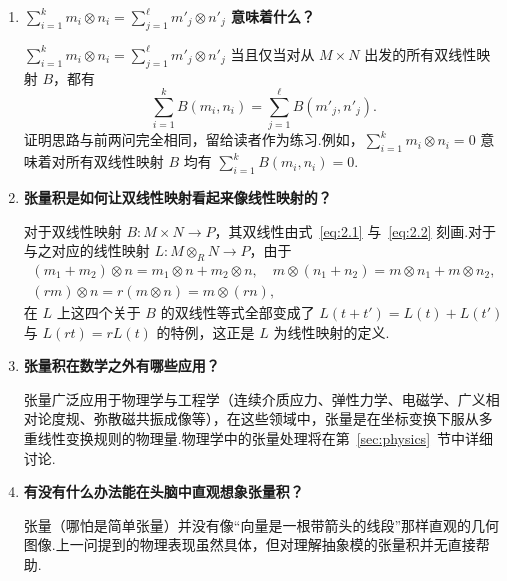 \begin{enumerate}
  回到例~\ref{ex:torsion-collapse}，当 $A$ 为扭群时 $\Q \otimes_\Z A = 0$，这无非是说从 $\Q \times A$ 出发的每一个 $\Z$-双线性映射都恒为零.这很容易直接验证：若 $B$ 是这样一个映射且 $na = 0$（$n \geq 1$），则
  \[
    B(r, a) = B\left(n \cdot \frac{r}{n}, a\right) = B\left(\frac{r}{n}, na\right) = B\left(\frac{r}{n}, 0\right) = 0.
  \]
  反用这一结论：\textbf{要证明某个张量积模 $M \otimes_R N \neq 0$，只需在 $M \times N$ 上构造出一个非零的双线性映射即可}.
  
  \item \textbf{$\sum_{i=1}^k m_i \otimes n_i = \sum_{j=1}^\ell m'_j \otimes n'_j$ 意味着什么？}
  
  $\sum_{i=1}^k m_i \otimes n_i = \sum_{j=1}^\ell m'_j \otimes n'_j$ 当且仅当对从 $M \times N$ 出发的所有双线性映射 $B$，都有
  \[
    \sum_{i=1}^k B(m_i, n_i) = \sum_{j=1}^\ell B(m'_j, n'_j).
  \]
  证明思路与前两问完全相同，留给读者作为练习.例如，$\sum_{i=1}^k m_i \otimes n_i = 0$ 意味着对所有双线性映射 $B$ 均有 $\sum_{i=1}^k B(m_i, n_i) = 0$.
  
  \item \textbf{张量积是如何让双线性映射看起来像线性映射的？}
  
  对于双线性映射 $B \colon M \times N \to P$，其双线性由式~\eqref{eq:2.1} 与~\eqref{eq:2.2} 刻画.对于与之对应的线性映射 $L \colon M \otimes_R N \to P$，由于
  \begin{gather*}
    (m_1 + m_2) \otimes n = m_1 \otimes n + m_2 \otimes n, \quad m \otimes (n_1 + n_2) = m \otimes n_1 + m \otimes n_2, \\
    (rm) \otimes n = r(m \otimes n) = m \otimes (rn),
  \end{gather*}
  在 $L$ 上这四个关于 $B$ 的双线性等式全部变成了 $L(t + t') = L(t) + L(t')$ 与 $L(rt) = rL(t)$ 的特例，这正是 $L$ 为线性映射的定义.
  
  \item \textbf{张量积在数学之外有哪些应用？}
  
  张量广泛应用于物理学与工程学（连续介质应力、弹性力学、电磁学、广义相对论度规、弥散磁共振成像等），在这些领域中，张量是在坐标变换下服从多重线性变换规则的物理量.物理学中的张量处理将在第~\ref{sec:physics}~节中详细讨论.
  
  \item \textbf{有没有什么办法能在头脑中直观想象张量积？}
  
  张量（哪怕是简单张量）并没有像``向量是一根带箭头的线段''那样直观的几何图像.上一问提到的物理表现虽然具体，但对理解抽象模的张量积并无直接帮助.
  

\end{enumerate}
